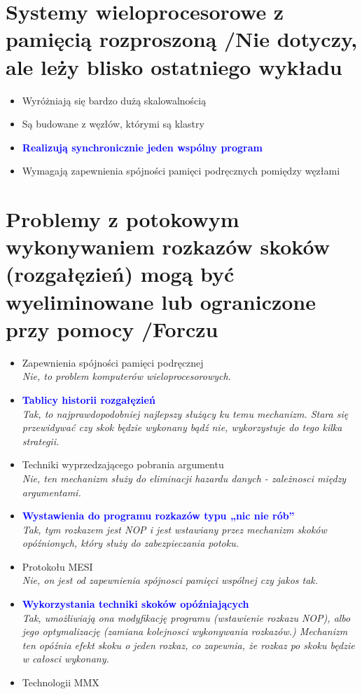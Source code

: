 \section{Systemy wieloprocesorowe z pamięcią rozproszoną {\small /Nie dotyczy, ale leży blisko ostatniego wykładu}}
	\begin{itemize}
    \item Wyróżniają się bardzo dużą skalowalnością
    \item Są budowane z węzłów, którymi są klastry
    \item \textcolor{Blue}{\textbf{Realizują synchronicznie jeden wspólny program}}
    \item Wymagają zapewnienia spójności pamięci podręcznych pomiędzy węzłami
    \end{itemize}

\section{Problemy z potokowym wykonywaniem rozkazów skoków (rozgałęzień) mogą być wyeliminowane lub ograniczone przy pomocy {\small /Forczu}}
	\begin{itemize}
    \item Zapewnienia spójności pamięci podręcznej\\
    {\small \emph{Nie, to problem komputerów wieloprocesorowych.}}
    \item \textcolor{Blue}{\textbf{Tablicy historii rozgałęzień}}\\
    {\small \emph{Tak, to najprawdopodobniej najlepszy służący ku temu mechanizm. Stara się przewidywać czy skok będzie wykonany bądź nie, wykorzystuje do tego kilka strategii.}}
    \item Techniki wyprzedzającego pobrania argumentu\\
    {\small \emph{Nie, ten mechanizm służy do eliminacji hazardu danych - zależnosci między argumentami.}}
    \item \textcolor{Blue}{\textbf{Wystawienia do programu rozkazów typu „nic nie rób”}}\\
    {\small \emph{Tak, tym rozkazem jest \emph{NOP} i jest wstawiany przez mechanizm skoków opóźnionych, który służy do zabezpieczania potoku.}}
    \item Protokołu MESI\\
    {\small \emph{Nie, on jest od zapewnienia spójnosci pamięci wspólnej czy jakos tak.}}
    \item \textcolor{Blue}{\textbf{Wykorzystania techniki skoków opóźniających}}\\
    {\small \emph{Tak, umożliwiają ona modyfikację programu (wstawienie rozkazu NOP), albo jego optymalizację (zamiana kolejnosci wykonywania rozkazów.) Mechanizm ten opóźnia efekt skoku o jeden rozkaz, co zapewnia, że rozkaz po skoku będzie w całosci wykonany.}}
    \item Technologii MMX
    \end{itemize}

